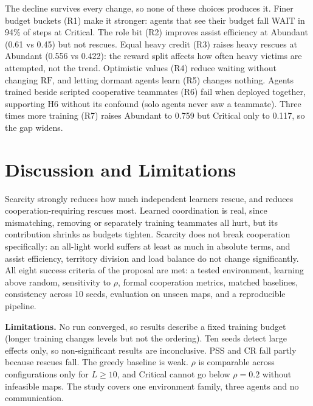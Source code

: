\documentclass{article}
\newcommand{\RF}{\mathrm{RF}}
\begin{document}
The decline survives every change, so none of these choices produces it. Finer budget buckets (R1) make it stronger:
agents that see their budget fall WAIT in 94\% of steps at Critical. The role bit (R2) improves assist efficiency at
Abundant (0.61 vs 0.45) but not rescues. Equal heavy credit (R3) raises heavy rescues at Abundant (0.556 vs 0.422):
the reward split affects how often heavy victims are attempted, not the trend. Optimistic values (R4) reduce waiting
without changing $\RF$, and letting dormant agents learn (R5) changes nothing. Agents trained beside scripted
cooperative teammates (R6) fail when deployed together, supporting H6 without its confound (solo agents never saw a
teammate). Three times more training (R7) raises Abundant to 0.759 but Critical only to 0.117, so the gap widens.

\section{Discussion and Limitations}
Scarcity strongly reduces how much independent learners rescue, and reduces cooperation-requiring rescues most.
Learned coordination is real, since mismatching, removing or separately training teammates all hurt, but its
contribution shrinks as budgets tighten. Scarcity does not break cooperation specifically: an all-light world suffers
at least as much in absolute terms, and assist efficiency, territory division and load balance do not change
significantly. All eight success criteria of the proposal are met: a tested environment, learning above random,
sensitivity to $\rho$, formal cooperation metrics, matched baselines, consistency across 10 seeds, evaluation on unseen
maps, and a reproducible pipeline.

\textbf{Limitations.} No run converged, so results describe a fixed training budget (longer training changes levels but
not the ordering). Ten seeds detect large effects only, so non-significant results are inconclusive. PSS and CR fall
partly because rescues fall. The greedy baseline is weak. $\rho$ is comparable across configurations only for
$L\ge10$, and Critical cannot go below $\rho=0.2$ without infeasible maps. The study covers one environment family,
three agents and no communication.

\end{document}
